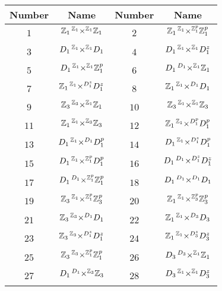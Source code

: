 \documentclass[11pt]{article}
\newcommand{\amal}[5]{#1\prescript{#2}{}{\underset{#3}{\times}}^{#4}#5}
\begin{document}
  \begin{table}
    \centering
    \begin{tabularx}{.6\textwidth}{@{}|c|C||c|C|@{}}
      \toprule
      Number & Name & Number & Name \\
      \midrule
      $1$ & $\amal{\mathbb{Z}_1}{\mathbb{Z}_1}{}{\mathbb{Z}_1}{\mathbb{Z}_1}$ & $2$ & $\amal{\mathbb{Z}_1}{\mathbb{Z}_1}{}{\mathbb{Z}_1^p}{\mathbb{Z}_1^p}$ \\
      $3$ & $\amal{D_1}{\mathbb{Z}_1}{}{\mathbb{Z}_1}{D_1}$ & $4$ & $\amal{D_1}{\mathbb{Z}_1}{}{\mathbb{Z}_1}{D_1^z}$ \\
      $5$ & $\amal{D_1}{\mathbb{Z}_1}{}{\mathbb{Z}_1}{\mathbb{Z}_1^p}$ & $6$ & $\amal{D_1}{D_1}{}{\mathbb{Z}_1}{\mathbb{Z}_1}$ \\
      $7$ & $\amal{\mathbb{Z}_1}{\mathbb{Z}_1}{}{D_1^z}{D_1^z}$ & $8$ & $\amal{\mathbb{Z}_1}{\mathbb{Z}_1}{}{D_1}{D_1}$ \\
      $9$ & $\amal{\mathbb{Z}_3}{\mathbb{Z}_3}{}{\mathbb{Z}_1}{\mathbb{Z}_1}$ & $10$ & $\amal{\mathbb{Z}_3}{\mathbb{Z}_1}{}{\mathbb{Z}_1}{\mathbb{Z}_3}$ \\
      $11$ & $\amal{\mathbb{Z}_1}{\mathbb{Z}_1}{}{\mathbb{Z}_3}{\mathbb{Z}_3}$ & $12$ & $\amal{\mathbb{Z}_1}{\mathbb{Z}_1}{}{D_1^p}{D_1^p}$ \\
      $13$ & $\amal{D_1}{\mathbb{Z}_1}{}{D_1}{D_1^p}$ & $14$ & $\amal{D_1}{\mathbb{Z}_1}{}{D_1^z}{D_1^p}$ \\
      $15$ & $\amal{D_1}{\mathbb{Z}_1}{}{\mathbb{Z}_1^p}{D_1^p}$ & $16$ & $\amal{D_1}{D_1}{}{D_1^z}{D_1^z}$ \\
      $17$ & $\amal{D_1}{D_1}{}{\mathbb{Z}_1^p}{\mathbb{Z}_1^p}$ & $18$ & $\amal{D_1}{D_1}{}{D_1}{D_1}$ \\
      $19$ & $\amal{\mathbb{Z}_3}{\mathbb{Z}_1}{}{\mathbb{Z}_1^p}{\mathbb{Z}_3^p}$ & $20$ & $\amal{\mathbb{Z}_1}{\mathbb{Z}_1}{}{\mathbb{Z}_3^p}{\mathbb{Z}_3^p}$ \\
      $21$ & $\amal{\mathbb{Z}_3}{\mathbb{Z}_3}{}{D_1}{D_1}$ & $22$ & $\amal{\mathbb{Z}_1}{\mathbb{Z}_1}{}{D_3}{D_3}$ \\
      $23$ & $\amal{\mathbb{Z}_3}{\mathbb{Z}_3}{}{D_1^z}{D_1^z}$ & $24$ & $\amal{\mathbb{Z}_1}{\mathbb{Z}_1}{}{D_3^z}{D_3^z}$ \\
      $25$ & $\amal{\mathbb{Z}_3}{\mathbb{Z}_3}{}{\mathbb{Z}_1^p}{\mathbb{Z}_1^p}$ & $26$ & $\amal{D_3}{D_3}{}{\mathbb{Z}_1}{\mathbb{Z}_1}$ \\
      $27$ & $\amal{D_1}{D_1}{}{\mathbb{Z}_3}{\mathbb{Z}_3}$ & $28$ & $\amal{D_3}{\mathbb{Z}_1}{}{\mathbb{Z}_1}{D_3^z}$ \\

\end{tabularx}
\end{table}
\end{document}

